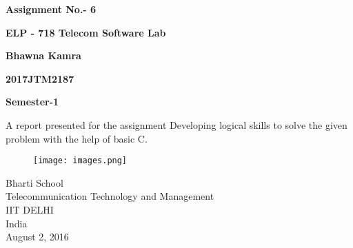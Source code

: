 \documentclass[12pt]{article}
\begin{document}
\begin{center}
\textbf{\LARGE  Assignment No.- 6} 
\end{center}

\begin{center}
\textbf{\LARGE ELP - 718 Telecom Software Lab }
\end{center}
\begin{center}

\end{center}
\begin{center}
\textbf{\large  Bhawna Kamra}
\end{center}
\begin{center}
\textbf{\large 2017JTM2187 }
\end{center}
\begin{center}
\textbf{\large Semester-1 }
\end{center}


\begin{center}

\end{center}
\begin{center}

\end{center}






\centering
A report presented for the assignment
Developing logical skills to solve the given problem with the help of basic C.




\begin{center}

\end{center}

\begin{center}

\end{center}



\begin{figure}[H]
\center
\texttt{[image: images.png]}
    
    
\end{figure} 

\begin{center}

\end{center}
\begin{center}

\end{center}

\begin{center}
Bharti School  \\
Telecommunication Technology and Management  \\
IIT DELHI  \\
India  \\

August 2, 2016

\end{center}
\end{document}
